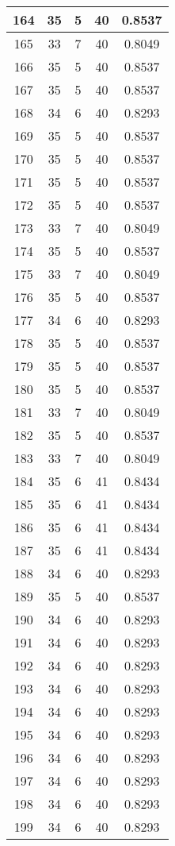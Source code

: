 \documentclass[letterpaper, 12pt]{article}
\begin{document}
\begin{longtable}{|c|c|c|c|c|}
\hline
164 & 35 & 5 & 40 & 0.8537 \\
\hline
165 & 33 & 7 & 40 & 0.8049 \\
\hline
166 & 35 & 5 & 40 & 0.8537 \\
\hline
167 & 35 & 5 & 40 & 0.8537 \\
\hline
168 & 34 & 6 & 40 & 0.8293 \\
\hline
169 & 35 & 5 & 40 & 0.8537 \\
\hline
170 & 35 & 5 & 40 & 0.8537 \\
\hline
171 & 35 & 5 & 40 & 0.8537 \\
\hline
172 & 35 & 5 & 40 & 0.8537 \\
\hline
173 & 33 & 7 & 40 & 0.8049 \\
\hline
174 & 35 & 5 & 40 & 0.8537 \\
\hline
175 & 33 & 7 & 40 & 0.8049 \\
\hline
176 & 35 & 5 & 40 & 0.8537 \\
\hline
177 & 34 & 6 & 40 & 0.8293 \\
\hline
178 & 35 & 5 & 40 & 0.8537 \\
\hline
179 & 35 & 5 & 40 & 0.8537 \\
\hline
180 & 35 & 5 & 40 & 0.8537 \\
\hline
181 & 33 & 7 & 40 & 0.8049 \\
\hline
182 & 35 & 5 & 40 & 0.8537 \\
\hline
183 & 33 & 7 & 40 & 0.8049 \\
\hline
184 & 35 & 6 & 41 & 0.8434 \\
\hline
185 & 35 & 6 & 41 & 0.8434 \\
\hline
186 & 35 & 6 & 41 & 0.8434 \\
\hline
187 & 35 & 6 & 41 & 0.8434 \\
\hline
188 & 34 & 6 & 40 & 0.8293 \\
\hline
189 & 35 & 5 & 40 & 0.8537 \\
\hline
190 & 34 & 6 & 40 & 0.8293 \\
\hline
191 & 34 & 6 & 40 & 0.8293 \\
\hline
192 & 34 & 6 & 40 & 0.8293 \\
\hline
193 & 34 & 6 & 40 & 0.8293 \\
\hline
194 & 34 & 6 & 40 & 0.8293 \\
\hline
195 & 34 & 6 & 40 & 0.8293 \\
\hline
196 & 34 & 6 & 40 & 0.8293 \\
\hline
197 & 34 & 6 & 40 & 0.8293 \\
\hline
198 & 34 & 6 & 40 & 0.8293 \\
\hline
199 & 34 & 6 & 40 & 0.8293 \\
\hline
\end{longtable}
\end{document}
